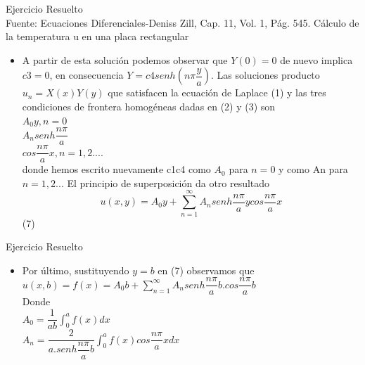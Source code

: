 \documentclass[11pt]{beamer}
\begin{document}
\begin{frame}{Ejercicio Resuelto\\
}{Fuente: Ecuaciones Diferenciales-Deniss Zill, Cap. 11, Vol. 1, Pág. 545.
Cálculo de la temperatura u en una placa rectangular}


  \begin{itemize}
  \item
   A partir de esta solución podemos observar que $Y(0)=0$ de nuevo implica $c3=0$, en
consecuencia $Y=c4senh(n\pi\dfrac{y}{a})$.
Las soluciones producto $u_{n}=X(x)Y(y)$ que satisfacen la ecuación de Laplace (1) y las
tres condiciones de frontera homogéneas dadas en (2) y (3) son\\
$A_{0}y, n=0$\\
$A_{n}senh\dfrac{n\pi}{a}$\\
$cos\dfrac{n\pi}{a}x, n=1,2....$\\
donde hemos escrito nuevamente c1c4 como $A_{0}$ para $n=0$ y como An para $n=1,2...$
El principio de superposición da otro resultado\\
$$u(x,y)=A_{0}y+\sum^{\infty}_{n=1}A_{n}senh\dfrac{n\pi}{a}ycos\dfrac{n\pi}{a}x$$ (7)\\


    
  \end{itemize}
\end{frame}

\begin{frame}{Ejercicio Resuelto\\
}
  \begin{itemize}
  \item
   Por último, sustituyendo $y=b$ en (7) observamos que
$u(x,b)=f(x)=A_{0}b+\sum^{\infty}_{n=1}A_{n}senh\dfrac{n\pi}{a}b.cos\dfrac{n\pi}{a}b$\\
Donde\\
$A_{0}=\dfrac{1}{ab}\int_{0}^{a}f(x)dx$\\
$A_{n}=\dfrac{2}{a.senh\dfrac{n\pi}{a}b}\int^{a}_{0}f(x)cos\dfrac{n\pi}{a}xdx$

    
  \end{itemize}
\end{frame}
\end{document}
